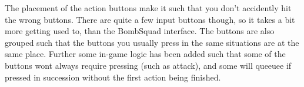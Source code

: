 The placement of the action buttons make it such that you don't accidently hit the wrong buttons. 
There are quite a few input buttons though, so it takes a bit more getting used to, than the BombSquad interface. 
The buttons are also grouped such that the buttons you usually press in the same situations are at the same place. 
Further some in-game logic has been added such that some of the buttons wont always require pressing (such as attack), and some will queeuee if pressed in succession without the first action being finished.